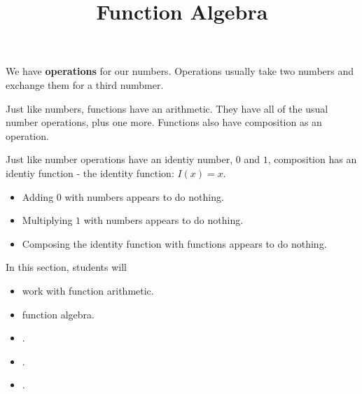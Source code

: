 \documentclass{ximera}
\title{Function Algebra}
\begin{document}
\begin{abstract}

\end{abstract}
\maketitle
















We have \textbf{operations} for our numbers.  Operations usually take two numbers and exchange them for a third numbmer.



Just like numbers, functions have an arithmetic.  They have all of the usual number operations, plus one more.  Functions also have composition as an operation.

Just like number operations have an identiy number, $0$ and $1$, composition has an identiy function - the identity function: $I(x) = x$.


\begin{itemize}
\item Adding $0$ with numbers appears to do nothing.
\item Multiplying $1$ with numbers appears to do nothing.
\item Composing the identity function with functions appears to do nothing.
\end{itemize}
















\begin{sectionOutcomes}
In this section, students will 

\begin{itemize}
\item work with function arithmetic.
\item function algebra.
\item .
\item .
\item .
\end{itemize}
\end{sectionOutcomes}
\end{document}
